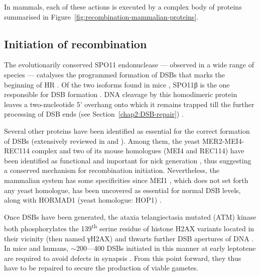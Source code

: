 In mammals, each of these actions is executed by a complex body of proteins summarised in Figure~\ref{fig:recombination-mammalian-proteins}. 



\subsection{Initiation of recombination}

The evolutionarily conserved SPO11 endonuclease — observed in a wide range of species \citep{baudat2000chromosome,mckim1998meiw68,romanienko2000mouse,steiner2002meiotic,bowring2006chromosome,stacey2006arabidopsis} — catalyses the programmed formation of DSBs \citep{keeney1997meiosisspecific,bergerat1997atypical} that marks the beginning of HR \citep{sun1989double}.
Of the two isoforms found in mice \citep{metzler-guillemain2000identification}, SPO11\textgreek{β} is the one responsible for DSB formation \citep{bellani2010expression}.
DNA cleavage by this homodimeric protein leaves a two-nucleotide 5' overhang \citep{demassy1995nucleotidea}	onto which it remains trapped till the further processing of DSB ends (see Section~\ref{chap2:DSB-repair}) \citep[reviewed in][]{cole2010evolutionarya}.

Several other proteins have been identified as essential for the correct formation of DSBs (extensively reviewed in \citealp{keeney2008spo11a} and \citealp{demassy2013initiation}).
Among them, the yeast MER2-MEI4-REC114 complex \citep{li2006saccharomyces,maleki2007interactions} and two of its mouse homologues (MEI4 and REC114) have been identified as functional and important for nick generation \citep{kumar2010functional,kumar2015mei4}, thus suggesting a conserved mechanism for recombination initiation. 
Nevertheless, the mammalian system has some specificities since MEI1 \citep{libby2002mouse,libby2003positional}, which does not set forth any yeast homologue, has been uncovered as essential for normal DSB levels, along with HORMAD1 (yeast homologue: HOP1) \citep{shin2010hormad1,daniel2011meiotic}.

Once DSBs have been generated, the ataxia telangiectasia mutated (ATM) kinase both phosphorylates the 139\textsuperscript{th} serine residue of histone H2AX variants located in their vicinity (then named \textgreek{γ}H2AX) \citep{rogakou1998dna,burma2001atm} and thwarts further DSB apertures of DNA \citep{lange2011atm,lukaszewicz2018control}.\\

In mice and humans, ${\sim}$200—400 DSBs initiated in this manner at early leptotene are required to avoid defects in synapsis \citep{kauppi2013numerical,smagulova2013suppression}.
From this point forward, they thus have to be repaired to secure the production of viable gametes.







